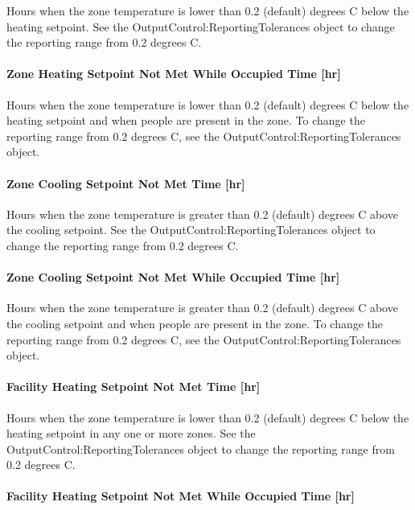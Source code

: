 Hours when the zone temperature is lower than 0.2 (default) degrees C below the heating setpoint. See the OutputControl:ReportingTolerances object to change the reporting range from 0.2 degrees C.

\paragraph{Zone Heating Setpoint Not Met While Occupied Time {[}hr{]}}\label{zone-heating-setpoint-not-met-while-occupied-time-hr}

Hours when the zone temperature is lower than 0.2 (default) degrees C below the heating setpoint and when people are present in the zone. To change the reporting range from 0.2 degrees C, see the OutputControl:ReportingTolerances object.

\paragraph{Zone Cooling Setpoint Not Met Time {[}hr{]}}\label{zone-cooling-setpoint-not-met-time-hr}

Hours when the zone temperature is greater than 0.2 (default) degrees C above the cooling setpoint. See the OutputControl:ReportingTolerances object to change the reporting range from 0.2 degrees C.

\paragraph{Zone Cooling Setpoint Not Met While Occupied Time {[}hr{]}}\label{zone-cooling-setpoint-not-met-while-occupied-time-hr}

Hours when the zone temperature is greater than 0.2 (default) degrees C above the cooling setpoint and when people are present in the zone. To change the reporting range from 0.2 degrees C, see the OutputControl:ReportingTolerances object.

\paragraph{Facility Heating Setpoint Not Met Time {[}hr{]}}\label{facility-heating-setpoint-not-met-time-hr}

Hours when the zone temperature is lower than 0.2 (default) degrees C below the heating setpoint in any one or more zones. See the OutputControl:ReportingTolerances object to change the reporting range from 0.2 degrees C.

\paragraph{Facility Heating Setpoint Not Met While Occupied Time {[}hr{]}}\label{facility-heating-setpoint-not-met-while-occupied-time-hr}


